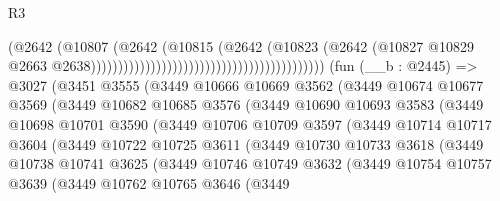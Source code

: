 \begin{lexlean}{R3}
\begin{coremodule}
                                                                          (@2642
                                                                            (@10807
                                                                              (@2642
                                                                                (@10815
                                                                                  (@2642
                                                                                    (@10823
                                                                                      (@2642
                                                                                        (@10827
                                                                                          @10829
                                                                                          @2663
                                                                                          @2638)))))))))))))))))))))))))))))))))))))))))))
    (fun (__b : @2445) =>
    @3027
      (@3451
        @3555
        (@3449
          @10666
          @10669
          @3562
          (@3449
            @10674
            @10677
            @3569
            (@3449
              @10682
              @10685
              @3576
              (@3449
                @10690
                @10693
                @3583
                (@3449
                  @10698
                  @10701
                  @3590
                  (@3449
                    @10706
                    @10709
                    @3597
                    (@3449
                      @10714
                      @10717
                      @3604
                      (@3449
                        @10722
                        @10725
                        @3611
                        (@3449
                          @10730
                          @10733
                          @3618
                          (@3449
                            @10738
                            @10741
                            @3625
                            (@3449
                              @10746
                              @10749
                              @3632
                              (@3449
                                @10754
                                @10757
                                @3639
                                (@3449
                                  @10762
                                  @10765
                                  @3646
                                  (@3449

\end{coremodule}
\end{lexlean}
